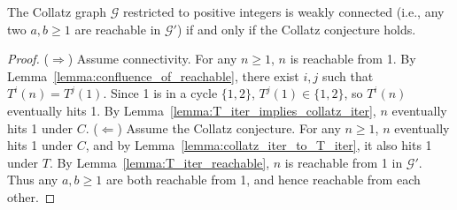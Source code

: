 \begin{theorem}\label{theorem:collatz_graph_weakly_connected_iff_collatz}\leanok
The Collatz graph $\mathcal{G}$ restricted to positive integers is weakly connected (i.e., any two $a, b \ge 1$ are reachable in $\mathcal{G}'$) if and only if the Collatz conjecture holds.
\end{theorem}
\begin{proof}\leanok
($\Rightarrow$) Assume connectivity. For any $n \ge 1$, $n$ is reachable from 1. By Lemma~\ref{lemma:confluence_of_reachable}, there exist $i, j$ such that $T^i(n) = T^j(1)$. Since 1 is in a cycle $\{1, 2\}$, $T^j(1) \in \{1, 2\}$, so $T^i(n)$ eventually hits 1. By Lemma~\ref{lemma:T_iter_implies_collatz_iter}, $n$ eventually hits 1 under $C$.
($\Leftarrow$) Assume the Collatz conjecture. For any $n \ge 1$, $n$ eventually hits 1 under $C$, and by Lemma~\ref{lemma:collatz_iter_to_T_iter}, it also hits 1 under $T$. By Lemma~\ref{lemma:T_iter_reachable}, $n$ is reachable from 1 in $\mathcal{G}'$. Thus any $a, b \ge 1$ are both reachable from 1, and hence reachable from each other.
\end{proof}
